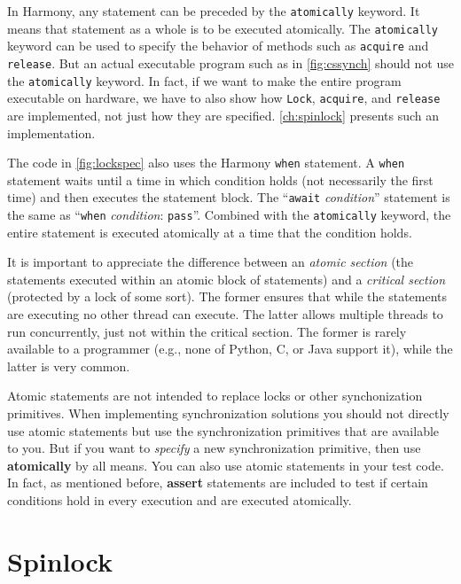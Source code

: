 \documentclass{report}
\begin{document}
In Harmony, any statement can be preceded by the \texttt{atomically}
keyword.  It means that statement as a whole is to be executed atomically.
The \texttt{atomically} keyword can be used to specify the behavior of
methods such as \texttt{acquire} and \texttt{release}.  But
an actual executable program such as in \autoref{fig:cssynch} should not
use the \texttt{atomically} keyword.
In fact, if we want to make the entire program executable on hardware,
we have to also show how \texttt{Lock}, \texttt{acquire}, and \texttt{release}
are implemented, not just how they are specified.
\autoref{ch:spinlock} presents such an implementation.

The code in \autoref{fig:lockspec} also uses the Harmony \texttt{when}
statement.  A \texttt{when} statement waits until a time in which
condition holds (not necessarily the first time) and then executes the
statement block.  The ``\texttt{await} \textit{condition}'' statement is
the same as ``\texttt{when} \textit{condition}: \texttt{pass}''.
Combined with the \texttt{atomically} keyword, the entire statement
is executed atomically at a time that the condition holds.

It is important to appreciate the difference between an
\emph{atomic section} (the statements executed within an
atomic block of statements) and a \emph{critical section}
(protected by a lock of some sort).
The former ensures that while the
statements are executing no other thread can execute.
The latter allows multiple threads to run concurrently,
just not within the critical section.
The former is rarely available to a programmer (e.g., none of
Python, C, or Java support it), while the latter
is very common.

Atomic statements
are not intended to replace locks or other synchonization primitives.
When implementing synchronization solutions you should not directly use
atomic statements but use the synchronization primitives that are available
to you.  But if you want to \emph{specify} a new synchronization primitive,
then use \textbf{atomically} by all means.
You can also use atomic statements in your test code.
In fact, as mentioned before, \textbf{assert} statements are included to
test if certain conditions hold in every execution and are executed
atomically.

\chapter{Spinlock}
\label{ch:spinlock}
%
\end{document}
